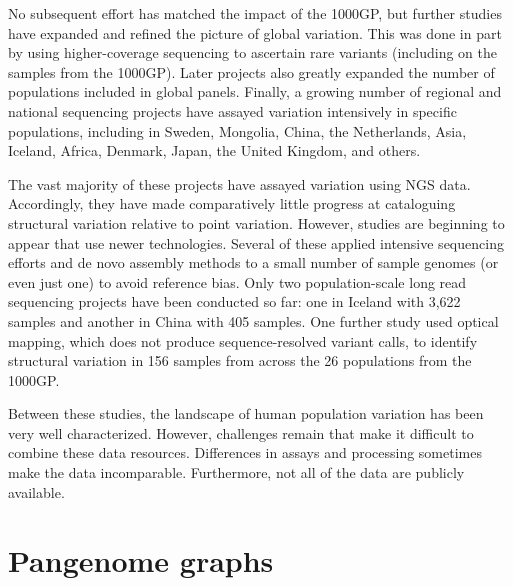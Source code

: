 \documentclass[11pt]{ucthesis}
\begin{document}
No subsequent effort has matched the impact of the 1000GP, but further studies have expanded and refined the picture of global variation. This was done in part by using higher-coverage sequencing to ascertain rare variants\cite{telenti2016deep} (including on the samples from the 1000GP\cite{byrska2021high}). Later projects also greatly expanded the number of populations included in global panels\cite{mallick2016simons,pagani2016genomic,bergstrom2020insights}. Finally, a growing number of regional and national sequencing projects have assayed variation intensively in specific populations, including in Sweden\cite{ameur2017swegen}, Mongolia\cite{bai2018whole}, China\cite{chiang2018comprehensive}, the Netherlands\cite{boomsma2014genome}, Asia\cite{genomeasia100k2019genomeasia}, Iceland\cite{gudbjartsson2015large}, Africa\cite{gurdasani2015african,sherman2019assembly}, Denmark\cite{maretty2017sequencing}, Japan\cite{nagasaki2015rare}, the United Kingdom\cite{uk10k2015uk10k}, and others.

The vast majority of these projects have assayed variation using NGS data. Accordingly, they have made comparatively little progress at cataloguing structural variation relative to point variation\cite{sudmant2015integrated}. However, studies are beginning to appear that use newer technologies. Several of these applied intensive sequencing efforts and de novo assembly methods to a small number of sample genomes\cite{ebert2021haplotype,audano2019characterizing,chaisson2019multi} (or even just one\cite{wu2021structural,seo2016novo}) to avoid reference bias. Only two population-scale long read sequencing projects have been conducted so far: one in Iceland with 3,622 samples\cite{beyter2021long} and another in China with 405 samples\cite{wu2021structural}. One further study used optical mapping, which does not produce sequence-resolved variant calls, to identify structural variation in 156 samples from across the 26 populations from the 1000GP\cite{levy2019genome}.

Between these studies, the landscape of human population variation has been very well characterized. However, challenges remain that make it difficult to combine these data resources. Differences in assays and processing sometimes make the data incomparable. Furthermore, not all of the data are publicly available.

\section{Pangenome graphs}
\end{document}
